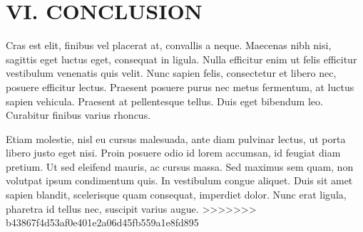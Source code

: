\documentclass[a4paper,fleqn,spanish]{cas-dc}
\begin{document}
\section{VI. CONCLUSION}\label{conclucion}

Cras est elit, finibus vel placerat at, convallis a neque. Maecenas nibh nisi,
sagittis eget luctus eget, consequat in ligula. Nulla efficitur enim ut felis
efficitur vestibulum venenatis quis velit. Nunc sapien felis, consectetur et
libero nec, posuere efficitur lectus. Praesent posuere purus nec metus
fermentum, at luctus sapien vehicula. Praesent at pellentesque tellus. Duis eget
bibendum leo. Curabitur finibus varius rhoncus.

Etiam molestie, nisl eu cursus malesuada, ante diam pulvinar lectus, ut porta
libero justo eget nisi. Proin posuere odio id lorem accumsan, id feugiat diam
pretium. Ut sed eleifend mauris, ac cursus massa. Sed maximus sem quam, non
volutpat ipsum condimentum quis. In vestibulum congue aliquet. Duis sit amet
sapien blandit, scelerisque quam consequat, imperdiet dolor. Nunc erat ligula,
pharetra id tellus nec, suscipit varius augue.
>>>>>>> b43867f4d53af0e401e2a06d45fb559a1e8fd895




%
%

%



%
\end{document}
